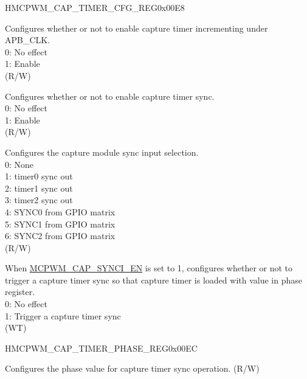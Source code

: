 \begin{register}{H}{MCPWM\_CAP\_TIMER\_CFG\_REG}{0x00E8}\label{regdesc:MCPWMCAPTIMERCFGREG}
%
%
%
%
%
\regnewline%
\begin{regdesc}\begin{reglist}
\label{fielddesc:MCPWMCAPTIMEREN}\item [MCPWM\_CAP\_TIMER\_EN] Configures whether or not to enable capture timer incrementing under APB\_CLK. \\
0: No effect\\
1: Enable\\
(R/W)
\label{fielddesc:MCPWMCAPSYNCIEN}\item [MCPWM\_CAP\_SYNCI\_EN] Configures whether or not to enable capture timer sync. \\
0: No effect\\
1: Enable\\
(R/W)
\label{fielddesc:MCPWMCAPSYNCISEL}\item [MCPWM\_CAP\_SYNCI\_SEL] Configures the capture module sync input selection. 
\\0: None 
\\1: timer0 sync out 
\\2: timer1 sync out 
\\3: timer2 sync out 
\\4: SYNC0 from GPIO matrix 
\\5: SYNC1 from GPIO matrix 
\\6: SYNC2 from GPIO matrix 
\\(R/W)
\label{fielddesc:MCPWMCAPSYNCSW}\item [MCPWM\_CAP\_SYNC\_SW] When \hyperref[fielddesc:MCPWMCAPSYNCIEN]{MCPWM\_CAP\_SYNCI\_EN} is set to 1, configures whether or not to trigger a capture timer sync so that capture timer is loaded with value in phase register. \\
0: No effect\\
1: Trigger a capture timer sync\\
(WT)
\end{reglist}\end{regdesc}
\end{register}


\begin{register}{H}{MCPWM\_CAP\_TIMER\_PHASE\_REG}{0x00EC}\label{regdesc:MCPWMCAPTIMERPHASEREG}
%
\regnewline%
\begin{regdesc}\begin{reglist}
\label{fielddesc:MCPWMCAPPHASE}\item [MCPWM\_CAP\_PHASE] Configures the phase value for capture timer sync operation. (R/W)
\end{reglist}\end{regdesc}
\end{register}


